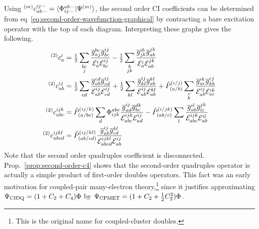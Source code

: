 \documentclass[11pt]{article}
\numberwithin{equation}{section}
\begin{document}
\begin{ex}
Using
${}^{(m)}c_{ab\cdots}^{ij\cdots}=\langle\Phi _{ij\cdots}^{ab\cdots}|\Psi ^{(m)}\rangle$, the second order CI coefficients can be determined from eq~\ref{eq:second-order-wavefunction-graphical} by contracting a bare excitation operator with the top of each diagram.
Interpreting these graphs gives the following.
\begin{align*}
  {}^{(2)}c_a^i
&=
  \tfrac{1}{2}
  \sum_{\substack{bc\\j}}
  \frac {
    \overline{g}_{aj}^{bc}
    \overline{g}_{bc}^{ij}
  }{
    \mathcal{E}_a^i
    \mathcal{E}_{bc}^{ij}
  }
-
  \tfrac{1}{2}
  \sum_{\substack{b\\jk}}
  \frac {
    \overline{g}_{jk}^{ib}
    \overline{g}_{ab}^{jk}
  }{
    \mathcal{E}_a^i
    \mathcal{E}_{ab}^{jk}
  }
\\
  {}^{(2)}c_{ab}^{ij}
&=
  \tfrac{1}{2}
  \sum_{\substack{cd}}
  \frac {
    \overline{g}_{ab}^{cd}
    \overline{g}_{cd}^{ij}
  }{
    \mathcal{E}_{ab}^{ij}
    \mathcal{E}_{cd}^{ij}
  }
+
  \tfrac{1}{2}
  \sum_{\substack{kl}}
  \frac {
    \overline{g}_{kl}^{ij}
    \overline{g}_{ab}^{kl}
  }{
    \mathcal{E}_{ab}^{ij}
    \mathcal{E}_{ab}^{kl}
  }
+
  \hat{P}_{(a/b)}^{(i/j)}
  \sum_{\substack{c\\k}}
  \frac {
    \overline{g}_{ac}^{ik}
    \overline{g}_{kb}^{cj}
  }{
    \mathcal{E}_{ab}^{ij}
    \mathcal{E}_{ac}^{ik}
  }
\\
  {}^{(2)}c_{abc}^{ijk}
&=
  \hat{P}_{(a/bc)}^{(ij/k)}
  \sum_{\substack{d}}
  \Phi _{ijk}^{abc}
  \frac {
    \overline{g}_{ad}^{ij}
    \overline{g}_{bc}^{dk}
  }{
    \mathcal{E}_{abc}^{ijk}
    \mathcal{E}_{ad}^{ij}
  }
-
  \hat{P}_{(ab/c)}^{(i/jk)}
  \sum_{\substack{l}}
  \frac {
    \overline{g}_{ab}^{il}
    \overline{g}_{lc}^{jk}
  }{
    \mathcal{E}_{abc}^{ijk}
    \mathcal{E}_{ab}^{il}
  }
\\
  {}^{(2)}c_{abcd}^{ijkl}
&=
  \hat{P}_{(ab/cd)}^{(ij/kl)}
  \frac {
    \overline{g}_{ab}^{ij}
    \overline{g}_{cd}^{kl}
  }{
    \mathcal{E}_{abcd}^{ijkl}
    \mathcal{E}_{ab}^{ij}
  }
\end{align*}
Note that the second order quadruples coefficient is disconnected.
Prop.~\ref{prop:second-order-c4} shows that the second-order quadruples operator is actually a simple product of first-order doubles operators.
This fact was an early motivation for coupled-pair many-electron theory,\footnote{This is the original name for coupled-cluster doubles.} since it justifies approximating
$
  \Psi _{\mathrm{CIDQ}}
=
  (1+C_2+C_4)\Phi 
$
by
$
  \Psi _{\mathrm{CPMET}}
=
  (1 + C_2 + \tfrac{1}{2}C_2^2)\Phi 
$.
\end{ex}
\end{document}
